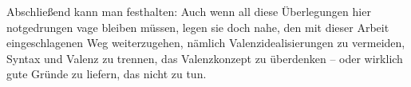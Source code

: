 Abschließend kann man festhalten: Auch wenn all diese Überlegungen hier notgedrungen vage bleiben müssen, legen sie doch nahe, den mit dieser Arbeit eingeschlagenen Weg weiterzugehen, nämlich Valenzidealisierungen zu vermeiden, Syntax und Valenz zu trennen, das Valenzkonzept zu überdenken -- oder wirklich gute Gründe zu liefern, das nicht zu tun. 



